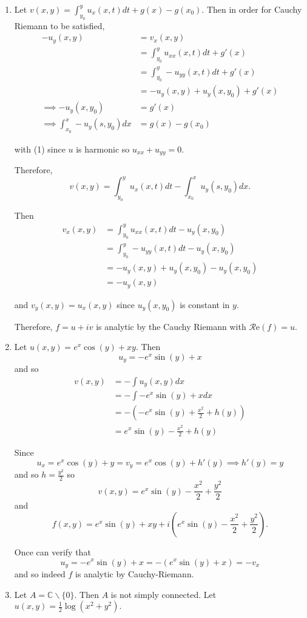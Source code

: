 \documentclass[12pt]{Homework}
\newcommand{\re}{\mathscr{R}\text{e}}
\begin{document}
\begin{solution}$\,$
\begin{enumerate}[label=(\alph*)]
    \item Let $v(x,y)=\int_{y_0}^yu_x(x,t)dt+g(x)-g(x_0).$ Then in order for Cauchy Riemann to be satisfied, \begin{align*}
        -u_y(x,y)&=v_x(x,y)\\
        &=\int_{y_0}^yu_{xx}(x,t)dt+g'(x)\\
        &=\int_{y_0}^y-u_{yy}(x,t)dt+g'(x)\tag{1}\\
        &=-u_y(x,y)+u_y(x,y_0)+g'(x)\\
        \implies -u_y(x,y_0)&=g'(x)\\
        \implies \int_{x_0}^x-u_y(s,y_0)dx&=g(x)-g(x_0)
    \end{align*}
    
    with (1) since $u$ is harmonic so $u_{xx}+u_{yy}=0$.
    
    Therefore, $$v(x,y)=\int_{y_0}^yu_x(x,t)dt-\int_{x_0}^xu_y(s,y_0)dx.$$
    
    Then \begin{align*}
        v_x(x,y)&=\int_{y_0}^yu_{xx}(x,t)dt-u_y(x,y_0)\\
        &=\int_{y_0}^y-u_{yy}(x,t)dt-u_y(x,y_0)\\
        &=-u_y(x,y)+u_y(x,y_0)-u_y(x,y_0)\\\
        &=-u_y(x,y)
    \end{align*}
    
    and $v_y(x,y)=u_x(x,y)$ since $u_y(x,y_0)$ is constant in $y$.
    
    Therefore, $f=u+iv$ is analytic by the Cauchy Riemann with $\re(f)=u$.
    \item Let $u(x,y)=e^x\cos(y)+xy$. Then $$u_y=-e^x\sin(y)+x$$ and so \begin{align*}
        v(x,y)&=-\int u_y(x,y)dx\\
        &=-\int-e^x\sin(y)+xdx\\
        &=-\left(-e^x\sin(y)+\frac{x^2}{2}+h(y)\right)\\
        &=e^x\sin(y)-\frac{x^2}{2}+h(y)
    \end{align*}
    
    Since $$u_x=e^x\cos(y)+y=v_y=e^x\cos(y)+h'(y)\implies h'(y)=y$$ and so $h=\frac{y^2}{2}$ so $$v(x,y)=e^x\sin(y)-\frac{x^2}{2}+\frac{y^2}{2}$$ and $$f(x,y)=e^x\sin(y)+xy+i(e^x\sin(y)-\frac{x^2}{2}+\frac{y^2}{2}).$$
    
    Once can verify that $$u_y=-e^x\sin(y)+x=-(e^x\sin(y)+x)=-v_x$$ and so indeed $f$ is analytic by Cauchy-Riemann.
    \item Let $A=\mathbb{C}\backslash\{0\}$. Then $A$ is not simply connected. Let $u(x,y)=\frac{1}{2}\log(x^2+y^2).$
    

\end{enumerate}
\end{solution}
\end{document}
